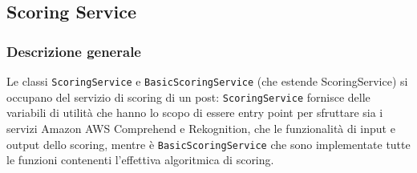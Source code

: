 \subsection{Scoring Service}
\subsubsection{Descrizione generale}
Le classi \verb+ScoringService+ e \verb+BasicScoringService+ (che estende ScoringService\verb++) si occupano
del servizio di scoring di un post: \verb+ScoringService+ fornisce delle variabili di utilità che
hanno lo scopo di essere entry point per sfruttare sia i servizi Amazon AWS Comprehend e Rekognition,
che le funzionalità di input e output dello scoring, mentre è \verb+BasicScoringService+ che sono 
implementate tutte le funzioni contenenti l'effettiva algoritmica di scoring.

